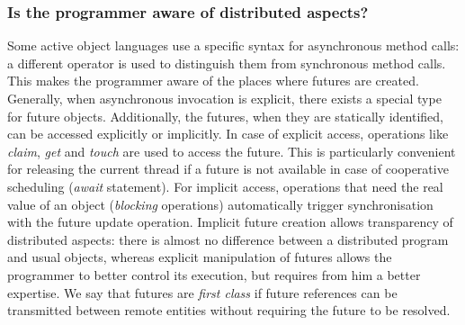 \subsubsection{Is the programmer aware of distributed aspects?}
Some active object languages use a specific syntax for asynchronous
method calls: a different operator is used to distinguish them from
synchronous method calls. This makes the programmer aware of the
places where futures are created. Generally, when asynchronous
invocation is explicit, there exists a special type for future objects.
Additionally, the futures, when they are statically identified, can be
accessed explicitly or implicitly. In case of explicit access,
operations like \emph{claim}, \emph{get} and \emph{touch} are used to
access the future. This is particularly convenient for releasing the
current thread if a future is not available in case of cooperative
scheduling (\emph{await} statement). For implicit access, operations that need the real
value of an object (\emph{blocking} operations) automatically trigger
synchronisation with the future update operation.
Implicit future creation allows transparency of distributed aspects:
there is almost no difference between a distributed program and usual
objects, whereas explicit manipulation of futures allows the
programmer to better control its execution, but requires from him a
better expertise. We say that futures
are \emph{first class} if future references can be transmitted between
remote entities without requiring the future to be resolved.
